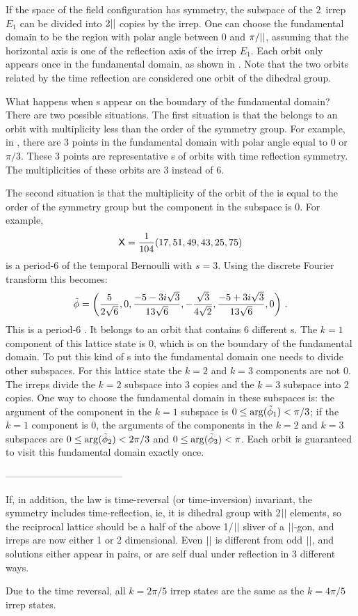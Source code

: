 If the space of the field configuration has \Dn{\cl{}} symmetry,
the subspace of the 2\dmn\ irrep $E_1$ can be divided
into $2{||}$ copies by the irrep. One can choose the fundamental domain to be the region
with polar angle between 0 and $\pi/{||}$, assuming that the horizontal axis is one of the
reflection axis of the irrep $E_1$. Each orbit only appears once in the fundamental domain,
as shown in . Note that the two orbits related by
the time reflection are considered one orbit of the dihedral group.

What happens when {\lattstate}s appear on the boundary of the fundamental domain?
There are two possible situations. The first situation is that the {\lattstate} belongs to an
orbit with multiplicity less than the order of the symmetry group. For example,
in , there are 3 points in the fundamental domain
with polar angle equal to 0 or $\pi/3$. These 3 points are representative {\lattstate}s of orbits
with time reflection symmetry. The multiplicities of these orbits are 3 instead of 6.

The second situation is that the multiplicity of
the orbit of the {\lattstate} is equal to the order of the symmetry group
but the component in the subspace is 0. For example,
\[
\mathsf{X} = \frac{1}{104} (17, 51, 49, 43, 25, 75)
\]
is a period-6 {\lattstate} of the temporal Bernoulli
 with $s=3$. Using the discrete Fourier transform
this {\lattstate} becomes:
\[
\tilde{\phi} =
\left(\frac{5}{2 \sqrt{6}},0,\frac{-5-3 i \sqrt{3}}{13
   \sqrt{6}},-\frac{\sqrt{3}}{4\sqrt{2}},\frac{-5+3 i \sqrt{3}}{13 \sqrt{6}},0\right) \,.
\]
This is a period-6 {\lattstate}. It belongs to an orbit that
contains 6 different {\lattstate}s. The $k=1$ component of this lattice
state is 0, which is on the boundary of the fundamental domain. To put this kind of
{\lattstate}s into the fundamental domain one needs to divide other subspaces.
For this lattice state the $k=2$ and $k=3$ components are not 0. The irreps divide
the $k=2$ subspace into 3 copies and the $k=3$ subspace into 2 copies. One way to
choose the fundamental domain in these subspaces is: the argument of the component
in the $k=1$ subspace is $0\leq\arg(\tilde{\phi}_{1})<\pi/3$; if the $k=1$ component
is 0, the arguments of the components
in the $k=2$ and $k=3$ subspaces are $0\leq\arg(\tilde{\phi}_{2})<2\pi/3{}$ and
$0\leq\arg(\tilde{\phi}_{3})<\pi$. Each orbit is guaranteed to visit this fundamental
domain exactly once.

\bigskip
------------------------------------

If, in addition, the law is time-reversal (or time-inversion) invariant,
the symmetry includes time-reflection, ie, it is dihedral group 
with 2${||}$ elements, so the reciprocal lattice should be a half of the
above 1/${||}$ sliver of a ${||}$-gon, and irreps are now either 1 or 2
dimensional. Even ${||}$ is different from odd ${||}$, and solutions either appear
in pairs, or are self dual under reflection in 3 different ways.

Due to the time
reversal, all $k={2\pi}/{5}$ irrep states are the same as the
$k={4\pi}/{5}$ irrep states.

